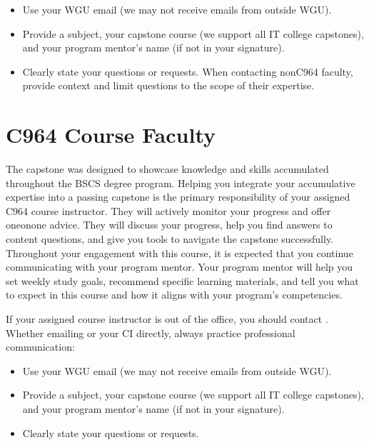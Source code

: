 \documentclass[letterpaper,10pt,english]{jupyterBook}
\begin{document}
\begin{itemize}
\item {} 
\sphinxAtStartPar
Use your WGU email (we may not receive emails from outside WGU).

\item {} 
\sphinxAtStartPar
Provide a subject, your capstone course (we support all IT college capstones), and your program mentor’s name (if not in your signature).

\item {} 
\sphinxAtStartPar
Clearly state your questions or requests. When contacting non\sphinxhyphen{}C964 faculty, provide context and limit questions to the scope of their expertise.

\end{itemize}

\sphinxstepscope


\section{C964 Course Faculty}
\label{\detokenize{ci_c964:c964-course-faculty}}\label{\detokenize{ci_c964:ci-c964}}\label{\detokenize{ci_c964::doc}}




\sphinxAtStartPar
The capstone was designed to showcase knowledge and skills accumulated throughout the BSCS degree program. Helping you integrate your accumulative expertise into a passing capstone is the primary responsibility of your assigned C964 course instructor. They will actively monitor your progress and offer one\sphinxhyphen{}on\sphinxhyphen{}one advice. They will discuss your progress, help you find answers to content questions, and give you tools to navigate the capstone successfully. Throughout your engagement with this course, it is expected that you continue communicating with your program mentor. Your program mentor will help you set weekly study goals, recommend specific learning materials, and tell you what to expect in this course and how it aligns with your program’s competencies.

\sphinxAtStartPar
If your assigned course instructor is out of the office, you should contact . Whether emailing  or your CI directly, always practice professional communication:
\begin{itemize}
\item {} 
\sphinxAtStartPar
Use your WGU email (we may not receive emails from outside WGU).

\item {} 
\sphinxAtStartPar
Provide a subject, your capstone course (we support all IT college capstones), and your program mentor’s name (if not in your signature).

\item {} 
\sphinxAtStartPar
Clearly state your questions or requests.

\end{itemize}
\end{document}
